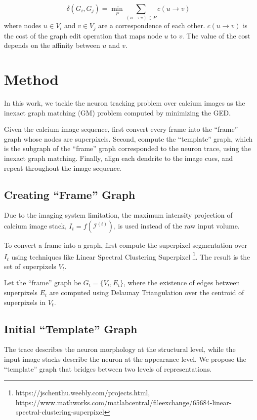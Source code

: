 \documentclass[10pt,letterpaper]{article}
\begin{document}
\begin{equation} \label{eq:ged}
\delta(G_i, G_j) = \min_P \sum_{(u \rightarrow v) \in P} c(u \rightarrow v)
\end{equation}
where nodes $u \in V_i$ and $v \in V_j$ are a correspondence of each other. $c(u \rightarrow v)$ is the cost of the graph edit operation that maps node $u$ to $v$. The value of the cost depends on the affinity between $u$ and $v$.

\section{Method}
In this work, we tackle the neuron tracking problem over calcium images as the inexact graph matching (GM) problem \cite{gao2010} computed by minimizing the GED.

Given the calcium image sequence, first convert every frame into the ``frame'' graph whose nodes are superpixels. Second, compute the ``template'' graph, which is the subgraph of the ``frame'' graph corresponded to the neuron trace, using the inexact graph matching. Finally, align each dendrite to the image cues, and repeat throughout the image sequence.




\subsection{Creating ``Frame'' Graph}
Due to the imaging system limitation, the maximum intensity projection of calcium image stack, $I_t = f(\mathcal{I}^{(t)})$, is used instead of the raw input volume. 

To convert a frame into a graph, first compute the superpixel segmentation over $I_t$ using techniques like Linear Spectral Clustering Superpixel \cite{li2015, chen2017}\footnote{https://jschenthu.weebly.com/projects.html,\\ https://www.mathworks.com/matlabcentral/fileexchange/65684-linear-spectral-clustering-superpixel}. The result is the set of superpixels $V_t$. 

Let the ``frame'' graph be $G_t = \{ V_t, E_t \}$, where the existence of edges between superpixels $E_t$ are computed using Delaunay Triangulation over the centroid of superpixels in $V_t$.


\subsection{Initial ``Template'' Graph}
The trace describes the neuron morphology at the structural level, while the input image stacks describe the neuron at the appearance level. We propose the ``template'' graph that bridges between two levels of representations.
\end{document}
